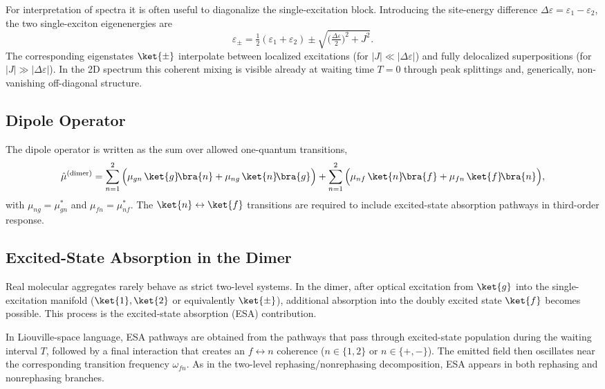For interpretation of spectra it is often useful to diagonalize the single-excitation block. Introducing the site-energy difference $\Delta\varepsilon=\varepsilon_1-\varepsilon_2$, the two single-exciton eigenenergies are
\begin{equation*}
	\varepsilon_{\pm} = \tfrac{1}{2}(\varepsilon_1+\varepsilon_2) \pm \sqrt{\big(\tfrac{\Delta\varepsilon}{2}\big)^2 + J^2}.
\end{equation*}
The corresponding eigenstates $\ket{\pm}$ interpolate between localized excitations (for $|J|\ll |\Delta\varepsilon|$) and fully delocalized superpositions (for $|J|\gg |\Delta\varepsilon|$). In the 2D spectrum this coherent mixing is visible already at waiting time $T=0$ through peak splittings and, generically, non-vanishing off-diagonal structure.

\subsection{Dipole Operator}


The dipole operator is written as the sum over allowed one-quantum transitions,
\begin{equation*}
	\hat{\mu}^{(\mathrm{dimer})}
	= \sum_{n=1}^{2} \Big(\mu_{gn}\,\ket{g}\!\bra{n} + \mu_{ng}\,\ket{n}\!\bra{g}\Big)
	+ \sum_{n=1}^{2} \Big(\mu_{nf}\,\ket{n}\!\bra{f} + \mu_{fn}\,\ket{f}\!\bra{n}\Big),
\end{equation*}
with $\mu_{ng}=\mu_{gn}^*$ and $\mu_{fn}=\mu_{nf}^*$. The $\ket{n}\leftrightarrow\ket{f}$ transitions are required to include excited-state absorption pathways in third-order response.

\subsection{Excited-State Absorption in the Dimer}
\label{sec:model_dimer_esa}

Real molecular aggregates rarely behave as strict two-level systems. In the dimer, after optical excitation from $\ket{g}$ into the single-excitation manifold ($\ket{1},\ket{2}$ or equivalently $\ket{\pm}$), additional absorption into the doubly excited state $\ket{f}$ becomes possible. This process is the excited-state absorption (ESA) contribution.

In Liouville-space language, ESA pathways are obtained from the pathways that pass through excited-state population during the waiting interval $T$, followed by a final interaction that creates an $f\leftrightarrow n$ coherence ($n\in\{1,2\}$ or $n\in\{+, -\}$). The emitted field then oscillates near the corresponding transition frequency $\omega_{fn}$. As in the two-level rephasing/nonrephasing decomposition, ESA appears in both rephasing and nonrephasing branches.

